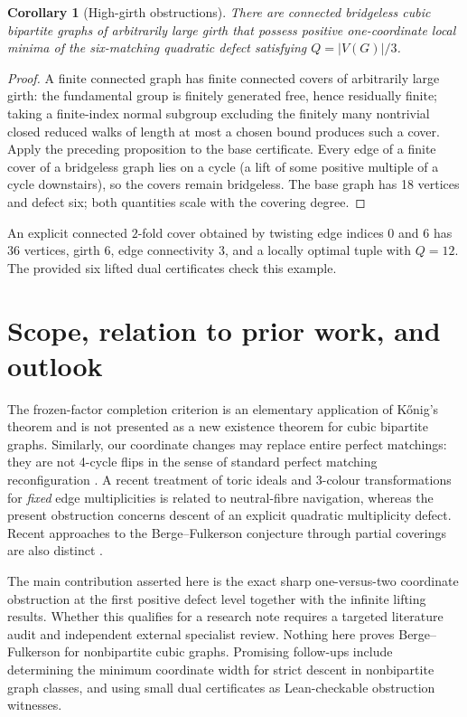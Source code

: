 \documentclass[11pt]{article}
\newtheorem{corollary}[theorem]{Corollary}
\begin{document}
\begin{corollary}[High-girth obstructions]
There are connected bridgeless cubic bipartite graphs of
arbitrarily large girth that possess positive one-coordinate
local minima of the six-matching quadratic defect satisfying
$Q=|V(G)|/3$.
\end{corollary}
\begin{proof}
A finite connected graph has finite connected covers of
arbitrarily large girth: the fundamental group is finitely
generated free, hence residually finite; taking a finite-index
normal subgroup excluding the finitely many nontrivial closed
reduced walks of length at most a chosen bound produces such
a cover. Apply the preceding proposition to the base certificate.
Every edge of a finite cover of a bridgeless graph lies on a
cycle (a lift of some positive multiple of a cycle downstairs),
so the covers remain bridgeless. The base graph has 18 vertices
and defect six; both quantities scale with the covering degree.
\end{proof}

An explicit connected $2$-fold cover obtained by twisting
edge indices $0$ and $6$ has $36$ vertices, girth $6$, edge
connectivity $3$, and a locally optimal tuple with $Q=12$.
The provided six lifted dual certificates check this example.

\section{Scope, relation to prior work, and outlook}
The frozen-factor completion criterion is an elementary
application of K\H onig's theorem and is not presented as a
new existence theorem for cubic bipartite graphs. Similarly,
our coordinate changes may replace entire perfect matchings:
they are not 4-cycle flips in the sense of standard perfect
matching reconfiguration \cite{Bonamy2019}. A recent treatment
of toric ideals and $3$-colour transformations for \emph{fixed}
edge multiplicities \cite{Mori2026} is related to neutral-fibre
navigation, whereas the present obstruction concerns descent of
an explicit quadratic multiplicity defect. Recent approaches to
the Berge--Fulkerson conjecture through partial coverings are
also distinct \cite{Luo2026}.

The main contribution asserted here is the exact sharp
one-versus-two coordinate obstruction at the first positive
defect level together with the infinite lifting results.
Whether this qualifies for a research note requires a targeted
literature audit and independent external specialist review.
Nothing here proves Berge--Fulkerson for nonbipartite cubic graphs.
Promising follow-ups include determining the minimum coordinate
width for strict descent in nonbipartite graph classes, and
using small dual certificates as Lean-checkable obstruction witnesses.
\end{document}
